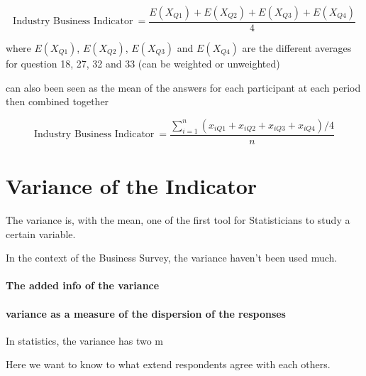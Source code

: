 \documentclass[12pt,a4paper,oneside]{book}
\begin{document}
\begin{equation}
    \mbox{Industry Business Indicator}\ = \frac{E(X_{Q1}) + E(X_{Q2}) + E(X_{Q3}) + E(X_{Q4})}{4}
\end{equation}

where 
$E(X_{Q1})$, $E(X_{Q2})$, $E(X_{Q3})$ and $E(X_{Q4})$ are the different averages for question 18, 27, 32 and 33 (can be weighted or unweighted)

can also been seen as the mean of the answers for each participant at each period then combined together

\begin{equation}
    \mbox{Industry Business Indicator}\ = \frac{\sum_{i=1}^n \left(x_{i Q1} + x_{i Q2} + x_{i Q3} + x_{i Q4} \right) / 4}{n}
\end{equation}


\chapter{Variance of the Indicator}

The variance is, with the mean, one of the first tool for Statisticians to study a certain variable.

In the context of the Business Survey, the variance haven't been used much.

\subsubsection{The added info of the variance}



\subsubsection{variance as a measure of the dispersion of the responses}

In statistics, the variance has two m

Here we want to know to what extend respondents agree with each others.


\end{document}
